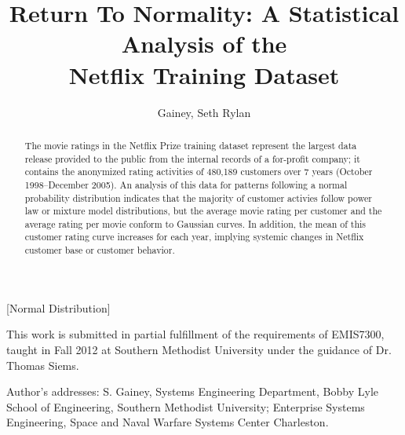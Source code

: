 \documentclass{acmtog}
\begin{document}

\title{Return To Normality: A Statistical Analysis of the\\ Netflix Training Dataset} %

\author{Gainey, Seth Rylan
}

[Normal Distribution]




\maketitle

\begin{bottomstuff}
This work is submitted in partial fulfillment of the requirements of EMIS7300, taught in Fall 2012 at Southern Methodist University under the guidance of Dr. Thomas Siems.

Author's addresses: S. Gainey, Systems Engineering Department,
Bobby Lyle School of Engineering, Southern Methodist University;
Enterprise Systems Engineering, Space and Naval Warfare Systems Center Charleston.
\end{bottomstuff}



\begin{abstract}
The movie ratings in the Netflix Prize training dataset represent the largest data release provided to the public from the internal records of a for-profit company; it contains the anonymized rating activities of 480,189 customers over 7 years (October 1998--December 2005). An analysis of this data for patterns following a normal probability distribution indicates that the majority of customer activies follow power law or mixture model distributions, but the average movie rating per customer and the average rating per movie conform to Gaussian curves. In addition, the mean of this customer rating curve increases for each year, implying systemic changes in Netflix customer base or customer behavior.
\end{abstract}
\end{document}
